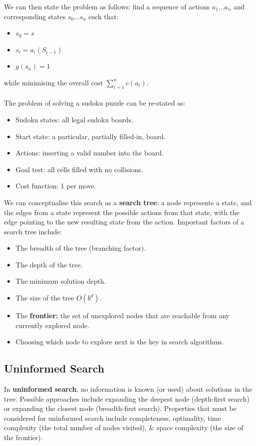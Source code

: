 \documentclass[a4paper,11pt]{article}
\begin{document}
We can then state the problem as follows:
find a sequence of actions $a_1 \dots a_n$ and corresponding states $s_0 \dots s_n$ such that:
\begin{itemize}
    \item   $s_0 = s$
    \item   $s_i = a_i(S_{i-1})$
    \item   $g(s_n) = 1$
\end{itemize}
while minimising the overall cost $\sum^n_{i=1} c(a_i)$.
\\\\
The problem of solving a sudoku puzzle can be re-stated as:
\begin{itemize}
    \item   Sudoku states: all legal sudoku boards.
    \item   Start state: a particular, partially filled-in, board.
    \item   Actions: inserting a valid number into the board.
    \item   Goal test: all cells filled with no collisions.
    \item   Cost function: 1 per move.
\end{itemize}

We can conceptualise this search as a \textbf{search tree}: a node represents a state, and the edges from a state represent the possible actions from that state, with the edge pointing to the new resulting state from the action.
Important factors of a search tree include:
\begin{itemize}
    \item   The breadth of the tree (branching factor).
    \item   The depth of the tree.
    \item   The minimum solution depth.
    \item   The size of the tree $O(b^d)$.
    \item   The \textbf{frontier:} the set of unexplored nodes that are reachable from any currently explored node.
    \item   Choosing which node to explore next is the key in search algorithms.
\end{itemize}

\subsection{Uninformed Search}
In \textbf{uninformed search}, no information is known (or used) about solutions in the tree.
Possible approaches include expanding the deepest node (depth-first search) or expanding the closest node (breadth-first search).
Properties that must be considered for uninformed search include completeness, optimality, time complexity (the total number of nodes visited), \& space complexity (the size of the frontier).
\end{document}
